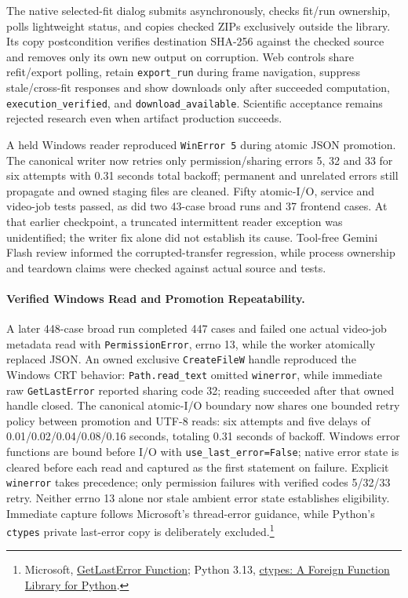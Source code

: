\documentclass[11pt,letterpaper]{article}
\newcommand{\code}[1]{\nolinkurl{#1}}
\begin{document}
The native selected-fit dialog submits asynchronously, checks fit/run ownership,
polls lightweight status, and copies checked ZIPs exclusively outside the
library. Its copy postcondition verifies destination SHA-256 against the checked
source and removes only its own new output on corruption. Web controls share
refit/export polling, retain \code{export_run} during frame navigation, suppress
stale/cross-fit responses and show downloads only after succeeded computation,
\code{execution_verified}, and \code{download_available}. Scientific acceptance
remains rejected research even when artifact production succeeds.

A held Windows reader reproduced \code{WinError 5} during atomic JSON promotion.
The canonical writer now retries only permission/sharing errors 5, 32 and 33
for six attempts with 0.31 seconds total backoff; permanent and unrelated errors
still propagate and owned staging files are cleaned. Fifty atomic-I/O, service
and video-job tests passed, as did two 43-case broad runs and 37 frontend cases.
At that earlier checkpoint, a truncated intermittent reader exception was
unidentified; the writer fix alone did not establish its cause. Tool-free
Gemini Flash review informed the corrupted-transfer regression, while process
ownership and teardown claims were checked against actual source and tests.

\paragraph{Verified Windows Read and Promotion Repeatability.}
A later 448-case broad run completed 447 cases and failed one actual video-job
metadata read with \code{PermissionError}, errno 13, while the worker atomically
replaced JSON. An owned exclusive \code{CreateFileW} handle reproduced the
Windows CRT behavior: \code{Path.read\_text} omitted \code{winerror}, while
immediate raw \code{GetLastError} reported sharing code 32; reading succeeded
after that owned handle closed. The canonical atomic-I/O boundary now shares
one bounded retry policy between promotion and UTF-8 reads: six attempts and
five delays of 0.01/0.02/0.04/0.08/0.16 seconds, totaling 0.31 seconds of backoff.
Windows error functions are bound before I/O with
\code{use\_last\_error=False}; native error state is cleared before each read
and captured as the first statement on failure. Explicit \code{winerror}
takes precedence; only permission failures with verified codes 5/32/33 retry.
Neither errno 13 alone nor stale ambient error state establishes eligibility.
Immediate capture follows Microsoft's thread-error guidance, while Python's
\code{ctypes} private last-error copy is deliberately excluded.\footnote{
Microsoft, \href{https://learn.microsoft.com/en-us/windows/win32/api/errhandlingapi/nf-errhandlingapi-getlasterror}{GetLastError Function};
Python 3.13, \href{https://docs.python.org/3.13/library/ctypes.html}{ctypes: A Foreign Function Library for Python}.}
\end{document}
